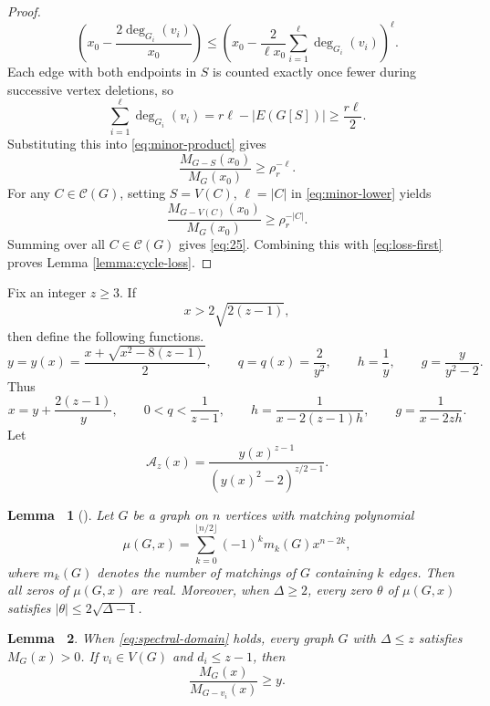 \documentclass[11pt, a4paper]{article}
\theoremstyle{plain}
\newtheorem{lemma}{Lemma\ }[section]
\begin{document}
\begin{proof}
\begin{equation}
\left(
x_0-\frac{2\deg_{G_i}(v_i)}{x_0}
\right)
\leq
\left(
x_0-\frac{2}{\ell x_0}
\sum_{i=1}^{\ell}\deg_{G_i}(v_i)
\right)^{\ell}.
\label{eq:minor-product}
\end{equation}
Each edge with both endpoints in $S$ is counted exactly once fewer during successive vertex deletions, so
\[
 \sum_{i=1}^{\ell}\deg_{G_i}(v_i)
 =r\ell-|E(G[S])|\geq\frac{r\ell}{2}.
\]
Substituting this into \eqref{eq:minor-product} gives
\begin{equation}\label{eq:minor-lower}
 \frac{M_{G-S}(x_0)}{M_G(x_0)}\geq \rho_r^{-\ell}.
\end{equation}
For any $C\in\mathcal{C}(G)$,
setting $S=V(C)$, $\ell=|C|$ in \eqref{eq:minor-lower} yields
\[
\frac{M_{G-V(C)}(x_0)}
{M_G(x_0)}
\ge
\rho_r^{-|C|}.
\]
Summing over all $C\in\mathcal{C}(G)$ gives \eqref{eq:25}.
Combining this with \eqref{eq:loss-first} proves Lemma \ref{lemma:cycle-loss}.
\end{proof}

Fix an integer $z\geq3$. If
\begin{equation}\label{eq:spectral-domain}
 x>2\sqrt{2(z-1)},
\end{equation}
then define the following functions.
\begin{equation}\label{eq:yqg}
 y=y(x)=\frac{x+\sqrt{x^2-8(z-1)}}2,
 \qquad q=q(x)=\frac2{y^2}, \qquad
 h=\frac1y, \qquad g=\frac{y}{y^2-2}.
\end{equation}
Thus
\begin{equation}\label{eq:y-identities}
 x=y+\frac{2(z-1)}y, \qquad
 0<q<\frac1{z-1}, \qquad
 h=\frac1{x-2(z-1)h}, \qquad
 g=\frac1{x-2zh}.
\end{equation}
Let
\begin{equation}\label{eq:tree-expression}
 \mathcal{A}_z(x)=\frac{y(x)^{z-1}}
                {(y(x)^2-2)^{z/2-1}}.
\end{equation}

\begin{lemma}[\cite{Heilmann1972}]\label{lem:30}
Let $G$ be a graph on $n$ vertices with matching polynomial
\[
\mu(G,x)
=
\sum_{k=0}^{\lfloor n/2\rfloor}
(-1)^k m_k(G)x^{n-2k},
\]
where $m_k(G)$ denotes the number of matchings of $G$ containing $k$ edges.
Then all zeros of $\mu(G,x)$ are real. Moreover, when $\Delta\ge 2$,
every zero $\theta$ of $\mu(G,x)$ satisfies
$|\theta|\le 2\sqrt{\Delta-1}$.
\end{lemma}

\begin{lemma}\label{lem:matching-positive}
When \eqref{eq:spectral-domain} holds, every graph $G$ with $\Delta \leq z$
satisfies $M_G(x)>0$.
If $v_i\in V(G)$ and $d_i\leq z-1$, then
\begin{equation}\label{eq:cavity-lower}
 \frac{M_G(x)}{M_{G-v_i}(x)}\geq y.
\end{equation}
\end{lemma}
\end{document}
